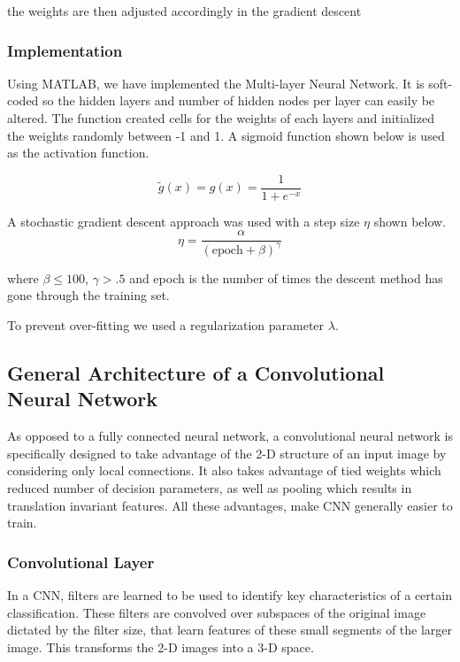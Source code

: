 \documentclass[12pt, twocolumn]{article}
\begin{document}
the weights are then adjusted accordingly in the gradient descent



\subsubsection{Implementation}
Using MATLAB, we have implemented the Multi-layer Neural Network. It is soft-coded so the hidden layers and number of hidden nodes per layer can easily be altered. The function created cells for the weights of each layers and initialized the weights randomly between -1 and 1.
\newline
A sigmoid function shown below is used as the activation function.

\begin{equation}
\tilde{g}(x)= g(x) = \frac{1}{ 1+e^{-x}}
\end{equation}

A stochastic gradient descent approach was used with a step size $\eta$ shown below.
\begin{equation}
\eta = \frac{ \alpha}{ (\textrm{epoch} + \beta)^\gamma}
\end{equation}

where $\beta \leq 100$, $\gamma >.5$ and epoch is the number of times the descent method has gone through the training set.  
\newline\newline

To prevent over-fitting we used a regularization parameter $\lambda$. 


\subsection{General Architecture of a Convolutional Neural Network}
As opposed to a fully connected neural network, a convolutional neural network is specifically designed to take advantage of the 2-D structure of an input image by considering only local connections. It also takes advantage of tied weights which reduced number of decision parameters, as well as pooling which results in translation invariant features. All these advantages, make CNN generally easier to train. 



\subsubsection{Convolutional Layer}
In a CNN, filters are learned to be used to identify key characteristics of a certain classification. These filters are convolved over subspaces of the original image dictated by the filter size, that learn features of these small segments of the larger image.  This transforms the 2-D images into a 3-D space.
\end{document}
